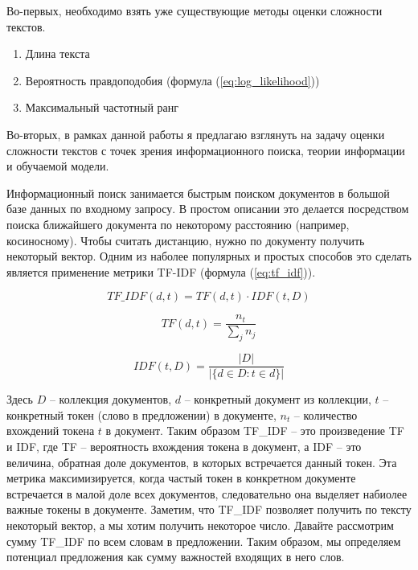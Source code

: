 \documentclass{spbau-diploma}
\begin{document}
Во-первых, необходимо взять уже существующие методы оценки сложности текстов.
\begin{enumerate}
	\item Длина текста
	\item Вероятность правдоподобия (формула (\ref{eq:log_likelihood}))
	\item Максимальный частотный ранг
\end{enumerate}

Во-вторых, в рамках данной работы я предлагаю взглянуть на задачу оценки сложности текстов с точек зрения информационного поиска, теории информации и обучаемой модели.

Информационный поиск занимается быстрым поиском документов в большой базе данных по входному запросу. В простом описании это делается посредством поиска ближайшего документа по некоторому расстоянию (например, косиносному). Чтобы считать дистанцию, нужно по документу получить некоторый вектор. Одним из наболее популярных и простых способов это сделать является применение метрики TF-IDF (формула (\ref{eq:tf_idf})).

\begin{equation} \label{eq:tf_idf}
TF\_IDF(d,t) = TF(d,t)\cdot IDF(t,D)
\end{equation}

\begin{equation} \label{eq:tf}
TF(d,t) = \frac{n_t}{\sum\limits_{j}n_j}
\end{equation}

\begin{equation} \label{eq:idf}
IDF(t,D) = \frac{|D|}{|\{d\in D\colon t \in d\}|}
\end{equation}

Здесь $D$ -- коллекция документов, $d$ -- конкретный документ из коллекции, $t$ -- конкретный токен (слово в предложении) в документе, $n_t$ -- количество вхождений токена $t$ в документ. Таким образом TF\_IDF -- это произведение TF и IDF, где TF -- вероятность вхождения токена в документ, а IDF -- это величина, обратная доле документов, в которых встречается данный токен. Эта метрика максимизируется, когда частый токен в конкретном документе встречается в малой доле всех документов, следовательно она выделяет набиолее важные токены в документе. Заметим, что TF\_IDF позволяет получить по тексту некоторый вектор, а мы хотим получить некоторое число. Давайте рассмотрим сумму TF\_IDF по всем словам в предложении. Таким образом, мы определяем потенциал предложения как сумму важностей входящих в него слов.
\end{document}
